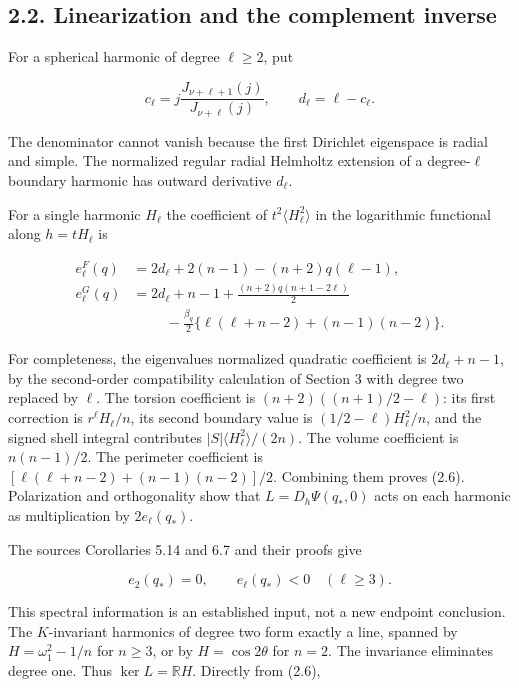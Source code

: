 \documentclass[11pt]{article}
\begin{document}
\subsection{2.2. Linearization and the complement
inverse}\label{linearization-and-the-complement-inverse}

For a spherical harmonic of degree \(\ell\ge2\), put

\[
c_\ell=j\frac{J_{\nu+\ell+1}(j)}{J_{\nu+\ell}(j)},
\qquad d_\ell=\ell-c_\ell.
\tag{2.5}
\]

The denominator cannot vanish because the first Dirichlet eigenspace is
radial and simple. The normalized regular radial Helmholtz extension of
a degree-\(\ell\) boundary harmonic has outward derivative \(d_\ell\).

For a single harmonic \(H_\ell\) the coefficient of
\(t^2\langle H_\ell^2\rangle\) in the logarithmic functional along
\(h=tH_\ell\) is

\[
\begin{aligned}
e^F_\ell(q)&=2d_\ell+2(n-1)-(n+2)q(\ell-1),\\
e^G_\ell(q)&=2d_\ell+n-1+\frac{(n+2)q(n+1-2\ell)}2\\
&\hspace{1cm}-\frac{\beta_q}{2}\{\ell(\ell+n-2)+(n-1)(n-2)\}.
\end{aligned}
\tag{2.6}
\]

For completeness, the eigenvalue\textquotesingle s normalized quadratic
coefficient is \(2d_\ell+n-1\), by the second-order compatibility
calculation of Section 3 with degree two replaced by \(\ell\). The
torsion coefficient is \((n+2)((n+1)/2-\ell)\): its first correction is
\(r^\ell H_\ell/n\), its second boundary value is
\((1/2-\ell)H_\ell^2/n\), and the signed shell integral contributes
\(|S|\langle H_\ell^2\rangle/(2n)\). The volume coefficient is
\(n(n-1)/2\). The perimeter coefficient is
\([\ell(\ell+n-2)+(n-1)(n-2)]/2\). Combining them proves (2.6).
Polarization and orthogonality show that \(L=D_h\Psi(q_*,0)\) acts on
each harmonic as multiplication by \(2e_\ell(q_*)\).

The source\textquotesingle s Corollaries 5.14 and 6.7 and their proofs
give

\[
e_2(q_*)=0,\qquad e_\ell(q_*)<0\quad(\ell\ge3).
\tag{2.7}
\]

This spectral information is an established input, not a new endpoint
conclusion. The \(K\)-invariant harmonics of degree two form exactly a
line, spanned by \(H=\omega_1^2-1/n\) for \(n\ge3\), or by
\(H=\cos2\theta\) for \(n=2\). The invariance eliminates degree one.
Thus \(\ker L=\mathbb RH\). Directly from (2.6),
\end{document}
